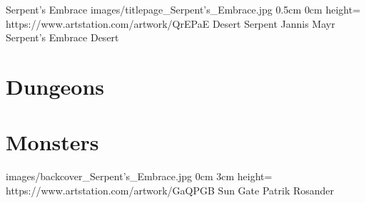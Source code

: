 \documentclass[letterpaper,openany,twoside,twocolumn]{book}
\begin{document}
	\regionTitlePage
		{Serpent's Embrace}
		{images/titlepage_Serpent's_Embrace.jpg}
		{0.5cm}
		{0cm}
		{height=\paperheight}
		{https://www.artstation.com/artwork/QrEPaE}
		{Desert Serpent}
		{Jannis Mayr}
		{Serpent's Embrace Desert}
	
	\tableofcontents
	
	\mainmatter
	
	\DungeonSheetGeometry
	\part{Dungeons}
	
	
	\MonsterSheetGeometry
	\part{Monsters}
	
	
	
	
	\bookLastPage
		{images/backcover_Serpent's_Embrace.jpg}
		{0cm}
		{3cm}
		{height=\paperheight}
		{https://www.artstation.com/artwork/GaQPGB}
		{Sun Gate}
		{Patrik Rosander}
		{}
\end{document}
